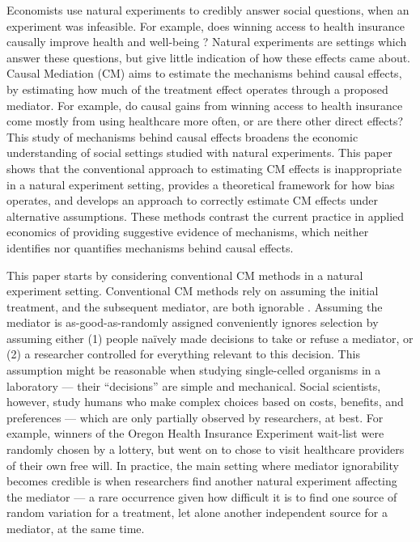 Economists use natural experiments to credibly answer social questions, when an experiment was infeasible.
For example, does winning access to health insurance causally improve health and well-being \citep{finkelstein2008oregon}?
Natural experiments are settings which answer these questions, but give little indication of how these effects came about.
Causal Mediation (CM) aims to estimate the mechanisms behind causal effects, by estimating how much of the treatment effect operates through a proposed mediator.
For example, do causal gains from winning access to health insurance come mostly from using healthcare more often, or are there other direct effects?
This study of mechanisms behind causal effects broadens the economic understanding of social settings studied with natural experiments.
This paper shows that the conventional approach to estimating CM effects is inappropriate in a natural experiment setting, provides a theoretical framework for how bias operates, and develops an approach to correctly estimate CM effects under alternative assumptions.
These methods contrast the current practice in applied economics of providing suggestive evidence of mechanisms, which neither identifies nor quantifies mechanisms behind causal effects.


This paper starts by considering conventional CM methods in a natural experiment setting.
Conventional CM methods rely on assuming the initial treatment, and the subsequent mediator, are both ignorable \citep{imai2010identification}.
Assuming the mediator is as-good-as-randomly assigned conveniently ignores selection by assuming either (1) people na\"ively made decisions to take or refuse a mediator, or (2) a researcher controlled for everything relevant to this decision.
This assumption might be reasonable when studying single-celled organisms in a laboratory --- their ``decisions'' are simple and mechanical.
Social scientists, however, study humans who make complex choices based on costs, benefits, and preferences --- which are only partially observed by researchers, at best.
For example, winners of the Oregon Health Insurance Experiment wait-list were randomly chosen by a lottery, but went on to chose to visit healthcare providers of their own free will.
In practice, the main setting where mediator ignorability becomes credible is when researchers find another natural experiment affecting the mediator --- a rare occurrence given how difficult it is to find one source of random variation for a treatment, let alone another independent source for a mediator, at the same time.

